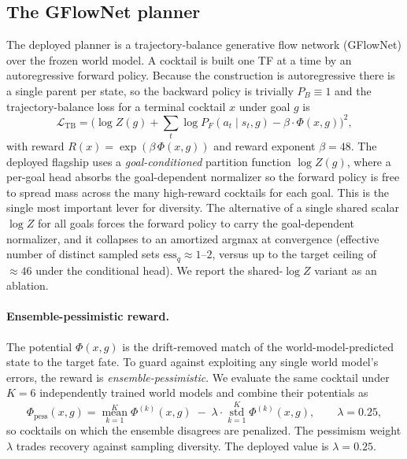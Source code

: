 \subsection{The GFlowNet planner}
The deployed planner is a trajectory-balance generative flow network (GFlowNet) over the frozen world model. A cocktail
is built one TF at a time by an autoregressive forward policy. Because the construction is
autoregressive there is a single parent per state, so the backward policy is trivially
$P_B\equiv1$ and the trajectory-balance loss for a terminal cocktail $x$ under goal $g$ is
\begin{equation}
\mathcal{L}_{\mathrm{TB}}
=\Big(\log Z(g) + \textstyle\sum_t \log P_F(a_t\mid s_t,g) - \beta\cdot\Phi(x,g)\Big)^2 ,
\label{eq:tb}
\end{equation}
with reward $R(x)=\exp(\beta\,\Phi(x,g))$ \citep{bengio2021gflownet} and reward exponent
$\beta{=}48$. The deployed flagship uses a \emph{goal-conditioned} partition function
$\log Z(g)$, where a per-goal head absorbs the goal-dependent normalizer so the forward policy is
free to spread mass across the many high-reward cocktails for each goal. This is the single
most important lever for diversity. The alternative of a single shared scalar $\log Z$ for
all goals forces the forward policy to carry the goal-dependent normalizer, and it collapses
to an amortized argmax at convergence (effective number of distinct sampled sets
$\mathrm{ess}_q\approx1$--$2$, versus up to the target ceiling of $\approx46$ under the
conditional head). We report the shared-$\log Z$ variant as an ablation.

\paragraph{Ensemble-pessimistic reward.} The potential $\Phi(x,g)$ is the drift-removed match
of the world-model-predicted state to the target fate. To guard against exploiting any single
world model's errors, the reward is \emph{ensemble-pessimistic}. We evaluate the same cocktail
under $K{=}6$ independently trained world models and combine their potentials as
\begin{equation}
\Phi_{\mathrm{pess}}(x,g)=\operatorname*{mean}_{k=1}^{K}\Phi^{(k)}(x,g)\;-\;\lambda\cdot\operatorname*{std}_{k=1}^{K}\Phi^{(k)}(x,g),
\qquad \lambda=0.25 ,
\label{eq:pess}
\end{equation}
so cocktails on which the ensemble disagrees are penalized. The pessimism weight $\lambda$
trades recovery against sampling diversity. The deployed value is $\lambda{=}0.25$.

